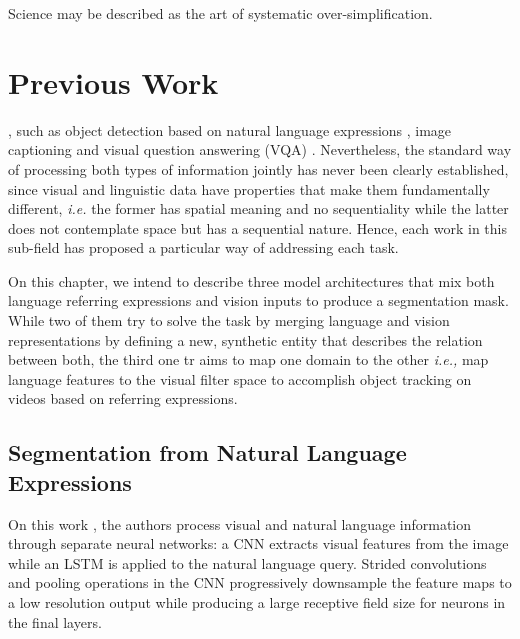 \begin{savequote}[75mm]
Science may be described as the art of systematic over-simplification.
\end{savequote}

\chapter{Previous Work}
\label{chap:previous_work}
, such as object detection based on natural language expressions \cite{hu_natural_2015}\cite{guadarrama_understanding_2016}, image captioning \cite{hendricks_deep_2015}\cite{gan_semantic_2016}\cite{johnson_densecap:_2016}\cite{yang_review_2016} and visual question answering (VQA) \cite{goyal_making_2016}\cite{zhu_visual7w:_2015}\cite{krishna_visual_2016}\cite{agrawal_vqa:_2015}\cite{teney_graph-structured_2016}. Nevertheless, the standard way of processing both types of information jointly has never been clearly established, since visual and linguistic data have properties that make them fundamentally different, \textit{i.e.} the former has spatial meaning and no sequentiality while the latter does not contemplate space but has a sequential nature. Hence, each work in this sub-field has proposed a particular way of addressing each task.

On this chapter, we intend to describe three model architectures that mix both language referring expressions and vision inputs to produce a segmentation mask. While two of them \cite{hu2016segmentation} \cite{liu2017segmentation} try to solve the task by merging language and vision representations by defining a new, synthetic entity that describes the relation between both, the third one \cite{li2017cvpr} tr aims to map one domain to the other \textit{i.e.,} map language features to the visual filter space to accomplish object tracking on videos based on referring expressions.

\section{Segmentation from Natural Language Expressions}
On this work \cite{hu2016segmentation}, the authors process visual and natural language information through separate neural networks: a CNN extracts visual features from the image while an LSTM is applied to the natural language query. Strided convolutions and pooling operations in the CNN progressively downsample the feature maps to a low resolution output while producing a large receptive field size for neurons in the final layers.


